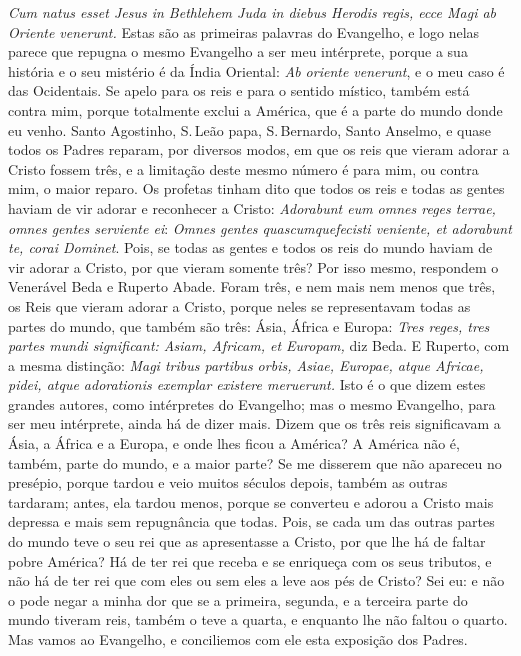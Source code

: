 \emph{Cum natus esset Jesus in Bethlehem Juda in diebus Herodis regis,
ecce Magi ab Oriente venerunt.} Estas são as primeiras palavras do
Evangelho, e logo nelas parece que repugna o mesmo Evangelho a ser meu
intérprete, porque a sua história e o seu mistério é da Índia Oriental:
\emph{Ab oriente venerunt}, e o meu caso é das Ocidentais. Se apelo
para os reis e para o sentido místico, também está contra mim, porque
totalmente exclui a América, que é a parte do mundo donde eu venho.
Santo Agostinho, S.\,Leão papa, S.\,Bernardo, Santo Anselmo, e quase todos
os Padres reparam, por diversos modos, em que os reis que vieram adorar
a Cristo fossem três, e a limitação deste mesmo número é para mim, ou
contra mim, o maior reparo. Os profetas tinham dito que todos os reis e
todas as gentes haviam de vir adorar e reconhecer a Cristo:
\emph{Adorabunt eum omnes reges terrae, omnes gentes serviente ei}:
\emph{Omnes gentes quascumquefecisti veniente, et
adorabunt te, corai Dominet}. Pois, se todas as
gentes e todos os reis do mundo haviam de vir adorar a Cristo, por que
vieram somente três? Por isso mesmo, respondem o Venerável Beda e
Ruperto Abade. Foram três, e nem mais nem menos que três, os Reis que
vieram adorar a Cristo, porque neles se
representavam todas as partes do mundo, que também são três: Ásia,
África e Europa: \emph{Tres reges, tres partes mundi significant: Asiam,
Africam, et Europam,} diz Beda. E Ruperto, com a mesma distinção:
\emph{Magi tribus partibus orbis, Asiae, Europae, atque Africae, pidei,
atque adorationis exemplar existere meruerunt.} Isto é o que dizem estes
grandes autores, como intérpretes do Evangelho; mas o mesmo Evangelho,
para ser meu intérprete, ainda há de dizer mais. Dizem que os três reis
significavam a Ásia, a África e a Europa, e onde lhes ficou a América? A
América não é, também, parte do mundo, e a maior parte? Se me disserem
que não apareceu no presépio, porque tardou e veio muitos séculos
depois, também as outras tardaram; antes, ela tardou menos, porque se
converteu e adorou a Cristo mais depressa e mais sem repugnância que
todas. Pois, se cada um das outras partes do mundo teve o seu rei que as
apresentasse a Cristo, por que lhe há de faltar pobre América? Há de ter
rei que receba e se enriqueça com os seus tributos, e não há de ter rei
que com eles ou sem eles a leve aos pés de Cristo? Sei eu: e não o
pode negar a minha dor que se a primeira, segunda, e a terceira parte do
mundo tiveram reis, também o teve a quarta, e enquanto lhe não faltou o
quarto. Mas vamos ao Evangelho, e conciliemos com ele
esta exposição dos Padres.

